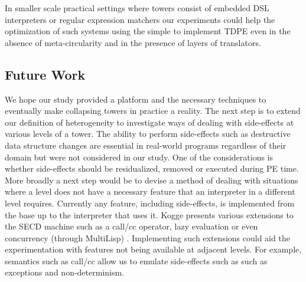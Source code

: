 \documentclass[a4paper,12pt,twoside,openright]{report}
\theoremstyle{definition}
\newcommand{\mslang}{$\lambda_{\uparrow\downarrow}$}
\newcommand{\mevl}{$M_{e}$}
\begin{document}

In smaller scale practical settings where towers consist of embedded DSL interpreters or regular expression matchers our experiments could help the optimization of such systems using the simple to implement TDPE even in the absence of meta-circularity and in the presence of layers of translators.

\subsection{Future Work}\label{subsec:future}
We hope our study provided a platform and the necessary techniques to eventually make collapsing towers in practice a reality. The next step is to extend our definition of heterogeneity to investigate ways of dealing with side-effects at various levels of a tower. The ability to perform side-effects such as destructive data structure changes are essential in real-world programs regardless of their domain but were not considered in our study.
One of the considerations is whether side-effects should be residualized, removed or executed during PE time. More broadly a next step would be to devise a method of dealing with situations where a level does not have a necessary feature that an interpreter in a different level requires. Currently any feature, including side-effects, is implemented from the base up to the interpreter that uses it. Kogge presents various extensions to the SECD machine such as a call/cc operator, lazy evaluation or even concurrency (through MultiLisp) \cite{kogge1990architecture}. Implementing such extensions could aid the experimentation with features not being available at adjacent levels. For example, semantics such as call/cc allow us to emulate side-effects such as such as exceptions and non-determinism.
\end{document}

